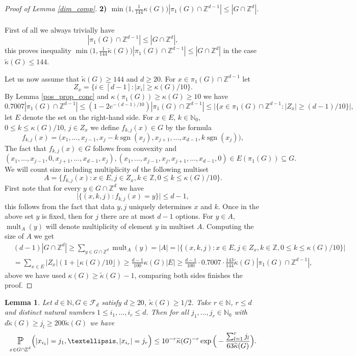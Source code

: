 \documentclass[10pt,a4paper]{amsart}
\numberwithin{equation}{section}
\newtheorem{Lem}[Thm]{Lemma}
\newcommand{\Pro}{\mathop{\mathbb{P}}}
\newcommand{\Z}{\mathbb{Z}}
\newcommand{\N}{\mathbb{N}}
\DeclareMathOperator{\sgn}{sgn}
\DeclareMathOperator{\mult}{mult}
\newcommand{\spr}[1]{\underset{_{\substack{#1}}}{\mathlarger{\mathlarger{\Pro}}}}
\begin{document}
\begin{proof}[Proof of Lemma \ref{dim_comp}]
\textbf{2) $ \min\big(1,\frac{1}{144}\kappa(G)\big) |\pi_1(G) \cap \Z^{d-1}| \le  |G \cap \Z^d|$}. \\
\\
First of all we always trivially have
\[
|\pi_1(G) \cap \Z^{d-1}| \le  |G \cap \Z^d|,
\]
this proves inequality $\min\big(1,\frac{1}{144}\widetilde{\kappa}(G)\big)|\pi_1(G) \cap \Z^{d-1}| \le  |G \cap \Z^d|$ in the case $\widetilde{\kappa}(G) \le 144 $. \par
Let us now assume that $\widetilde{\kappa}(G) \ge 144$ and $d \ge 20$.
For $x \in \pi_1(G) \cap \Z^{d-1} $ let 
\[
Z_x= \big\{ i \in [d-1]: |x_i| \ge \kappa(G)/10 \big\}.
\]
By Lemma \ref{pos_prop_conc} and $\kappa(\pi_1(G)) \ge \kappa(G) \ge 10$ we have
\[
0.7007|\pi_1(G) \cap \Z^{d-1}| \le(1-2e^{-(d-1)/10})|\pi_1(G) \cap \Z^{d-1}| \le  \Big| \Big\{ x \in \pi_1(G) \cap \Z^{d-1}: |Z_x| \ge (d-1)/10\Big\} \Big|,
\]
let $E$ denote the set on the right-hand side. For $x \in E$, $k \in \N_0$, $0 \le k \le \kappa(G)/10$, $j \in Z_x$ we define $f_{k,j}(x) \in G$ by the formula
\[
f_{k,j}(x)=\Big(x_1,...,x_{j-1},x_j-k\sgn(x_j), x_{j+1},...,x_{d-1}, k\sgn(x_j) \Big),
\]
The fact that $f_{k,j}(x) \in G$ follows from convexity and  
\[
(x_1,...,x_{j-1},0,x_{j+1},...,x_{d-1},x_j), (x_1,...,x_{j-1},x_j,x_{j+1},...,x_{d-1},0) \in E(\pi_1(G)) \subseteq G.
\]
We will count size including multiplicity of the following multiset 
\[
A=\Big\{ f_{k,j}(x): x \in E, j \in Z_x, k \in \Z, 0 \le k \le \kappa(G)/10\Big\}.
\]
First note that for every $y  \in G \cap \Z^d$ we have
\[
\Big| \Big\{ (x,k,j): f_{k,j}(x)=y \Big\} \Big| \le d-1,
\]
this follows from the fact that data $y,j$ uniquely determines $x$ and $k$. Once in the above set $y$ is fixed, then for $j$ there are at most $d-1$ options. For $y \in A$, $\mult_A(y)$ will denote multiplicity of element $y$ in multiset $A$. Computing the size of $A$ we get 
\begin{align*}
    &(d-1)|G \cap \Z^d| \ge \sum_{y \in G \cap \Z^d} \mult_A(y) = |A|= \Big|\Big\{ (x,k,j): x \in E, j \in Z_x, k \in \Z, 0 \le k \le \kappa(G)/10 \Big\} \Big| \\
    &= \sum_{x \in E} |Z_x| (1+ \lfloor \kappa(G)/10 \rfloor) \ge\frac{d-1}{100} \kappa(G) |E| \ge \frac{d-1}{100}\cdot0.7007 \cdot \frac{143}{144}\widetilde{\kappa}(G) |\pi_1(G) \cap \Z^{d-1}|,
\end{align*}
above we have used $\kappa(G) \ge  \widetilde{\kappa}(G)-1$, comparing both sides finishes the proof.
\end{proof}
\begin{Lem} \label{big_coord}
    Let $d \in \N, G \in \mathcal{F}_d$ satisfy $d \ge 20$, $\widetilde{\kappa}(G) \ge 1/2$. Take $r \in \N$, $r \le d$ and distinct natural numbers $1 \le i_1,...,i_r \le d$. Then for all $j_1,...,j_r \in \N_0$ with $d\widetilde{\kappa}(G) \ge j_l \ge 200 \widetilde{\kappa}(G)$ we have
    \[
    \spr{x \in G \cap \Z^d} \Big( |x_{i_1}|=j_1, \ldots,|x_{i_r}|=j_r \Big) \le  10^{-r}\widetilde{\kappa}(G)^{-r}\exp\Big(- \frac{\sum_{l=1}^rj_l}{63\widetilde{\kappa}(G)} \Big) .
    \]
\end{Lem}
\end{document}
